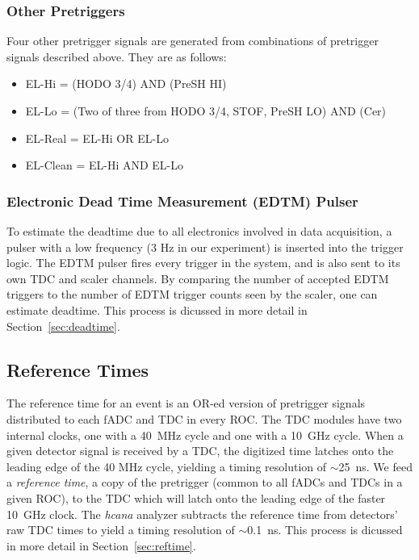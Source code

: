 \subsubsection{Other Pretriggers}
Four other pretrigger signals are generated from combinations of pretrigger
signals described above.
They are as follows:

\begin{itemize}
    \item EL-Hi = (HODO 3/4) AND (PreSH HI)
    \item EL-Lo = (Two of three from {HODO 3/4, STOF, PreSH LO}) AND (Cer)
    \item EL-Real = EL-Hi OR EL-Lo
    \item EL-Clean = EL-Hi AND EL-Lo
\end{itemize}

\subsubsection{Electronic Dead Time Measurement (EDTM) Pulser}
To estimate the deadtime due to all electronics involved in data acquisition, a
pulser with a low frequency (3 Hz in our experiment) is inserted into the
trigger logic.
The EDTM pulser fires every trigger in the system, and is also sent to its own
TDC and scaler channels.
By comparing the number of accepted EDTM triggers to the number of EDTM trigger
counts seen by the scaler, one can estimate deadtime.
This process is dicussed in more detail in Section~\ref{sec:deadtime}.

\subsection{Reference Times}
The reference time for an event is an OR-ed version of pretrigger signals
distributed to each fADC and TDC in every ROC.
The TDC modules have two internal clocks, one with a \SI{40}{MHz} cycle and one
with a \SI{10}{GHz} cycle.
When a given detector signal is received by a TDC, the digitized time latches
onto the leading edge of the 40 MHz cycle, yielding a timing resolution of
$\sim$\SI{25}{ns}.
We feed a \textit{reference time}, a copy of the pretrigger (common to all
fADCs and TDCs in a given ROC), to the TDC which will latch onto the leading
edge of the faster \SI{10}{GHz} clock.
The \textit{hcana} analyzer subtracts the reference time from detectors' raw
TDC times to yield a timing resolution of $\sim$\SI{0.1}{ns}.
This process is dicussed in more detail in Section~\ref{sec:reftime}.
